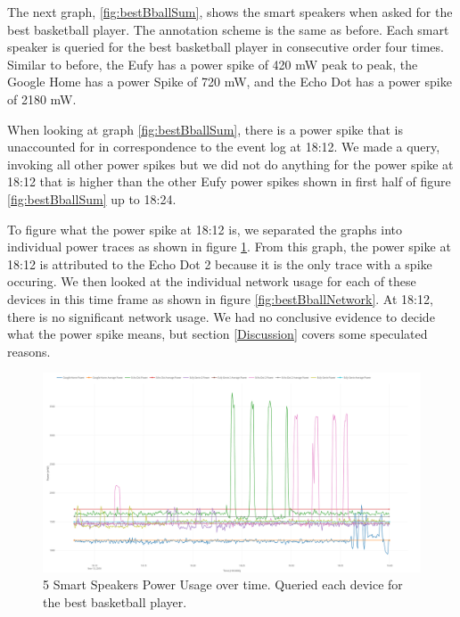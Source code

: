 The next graph, \ref{fig:bestBballSum}, shows the smart speakers when asked for the best basketball player. The annotation scheme is the same as before. Each smart speaker is queried for the best basketball player in consecutive order four times. Similar to before, the Eufy has a power spike of 420 mW peak to peak, the Google Home has a power Spike of 720 mW, and the Echo Dot has a power spike of 2180 mW.

When looking at graph \ref{fig:bestBballSum}, there is a power spike that is unaccounted for in correspondence to the event log at 18:12. We made a query, invoking all other power spikes but we did not do anything for the power spike at 18:12 that is higher than the other Eufy power spikes shown in first half of figure \ref{fig:bestBballSum} up to 18:24.

To figure what the power spike at 18:12 is, we separated the graphs into individual power traces as shown in figure \ref{fig:bestBballSeperate}. From this graph, the power spike at 18:12 is attributed to the Echo Dot 2 because it is the only trace with a spike occuring. We then looked at the individual network usage for each of these devices in this time frame as shown in figure \ref{fig:bestBballNetwork}. At 18:12, there is no significant network usage. We had no conclusive evidence to decide what the power spike means, but section \ref{Discussion} covers some speculated reasons.

\begin{figure}[H]
  \centering
  \includegraphics[width=1\textwidth]{figures/bestBballSeperate.png}
  \caption{5 Smart Speakers Power Usage over time. Queried each device for the
  best basketball player.}
  \label{fig:bestBballSeperate}
\end{figure}

